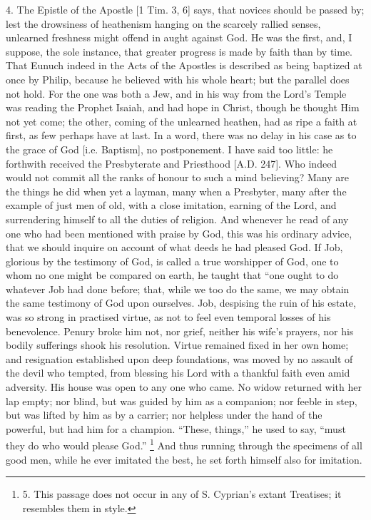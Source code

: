 4. The Epistle of the Apostle
[1 Tim. 3, 6] says, that novices should be passed by; lest the
drowsiness of heathenism hanging on the scarcely rallied senses,
unlearned freshness might offend in aught against God. He was the
first, and, I suppose, the sole instance, that greater progress is
made by faith than by time. That Eunuch indeed in the Acts of the
Apostles is described as being baptized at once by Philip, because he
believed with his whole heart; but the parallel does not hold. For the
one was both a Jew, and in his way from the Lord's Temple was reading
the Prophet Isaiah, and had hope in Christ, though he thought Him not
yet come; the other, coming of the unlearned heathen, had as ripe a
faith at first, as few perhaps have at last. In a word, there was no
delay in his case as to the grace of God [i.e. Baptism], no
postponement. I have said too little: he forthwith received the
Presbyterate and Priesthood [A.D. 247]. Who
indeed would not commit all the ranks of honour to such a mind
believing? Many are the things he did when yet a layman, many when a
Presbyter, many after the example of just men of old, with a close
imitation, earning of the Lord, and surrendering himself to all the
duties of religion. And whenever he read of any one who had been
mentioned with praise by God, this was his ordinary advice, that we
should inquire on account of what deeds he had pleased God. If Job,
glorious by the testimony of God, is called a true worshipper of God,
one to whom no one might be compared on earth, he taught that ``one
ought to do whatever Job had done before; that, while we too do the
same, we may obtain the same testimony of God upon ourselves. Job,
despising the ruin of his estate, was so strong in practised virtue,
as not to feel even temporal losses of his benevolence. Penury broke
him not, nor grief, neither his wife's prayers, nor his bodily
sufferings shook his resolution. Virtue remained fixed in her own
home; and resignation established upon deep foundations, was moved by
no assault of the devil who tempted, from blessing his Lord with a
thankful faith even amid adversity. His house was open to any one who
came. No widow returned with her lap empty; nor blind, but was guided
by him as a companion; nor feeble in step, but was lifted by him as by
a carrier; nor helpless under the hand of the powerful, but had him
for a champion. ``These, things,'' he used to say, ``must they do
who would please God.'' \footnote{5. This
passage does not occur in any of S. Cyprian's extant Treatises; it
resembles them in style.}
And thus running through the specimens of all good men, while he ever
imitated the best, he set forth himself also for imitation.

